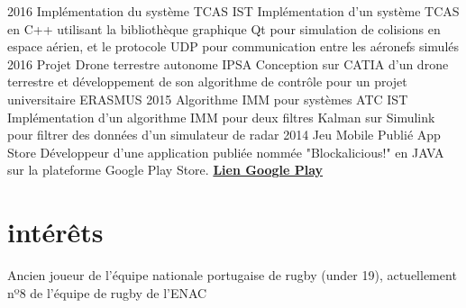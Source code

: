 \documentclass[a4paper]{friggeri-cv} %
\begin{document}
\begin{entrylist}



\entry
{2016}
{Implémentation du système TCAS}
{IST}
{Implémentation d'un système TCAS en C++ utilisant la bibliothèque graphique Qt pour simulation de colisions en espace aérien, et le protocole UDP pour communication entre les aéronefs simulés}
\entry
{2016}
{Projet Drone terrestre autonome}
{IPSA}
{Conception sur CATIA d'un drone terrestre et développement de son algorithme de contrôle pour un projet universitaire ERASMUS}
\entry
{2015}
{Algorithme IMM pour systèmes ATC}
{IST}
{Implémentation d'un algorithme IMM pour deux filtres Kalman sur Simulink pour filtrer des données d'un simulateur de radar}
\entry
{2014}
{Jeu Mobile Publié}
{App Store}
{Développeur d'une application publiée nommée "Blockalicious!" en JAVA sur la plateforme Google Play Store.
\href{https://play.google.com/store/apps/details?id=com.guiero.blockaliciousfinal}{\textbf{Lien Google Play}}}
\end{entrylist}




\section{intérêts}

Ancien joueur de l'équipe nationale portugaise de rugby (under 19), actuellement nº8 de l'équipe de rugby de l'ENAC

\end{document}
